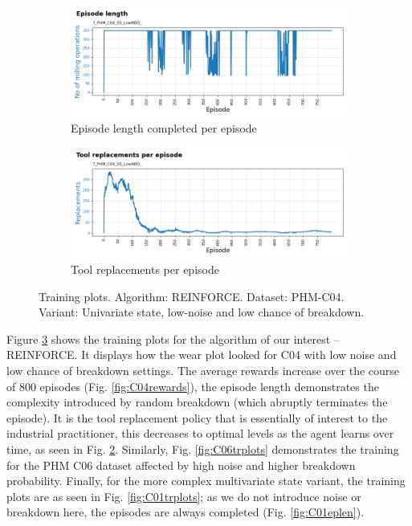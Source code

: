 \documentclass[a4paper, 12pt]{article}
\begin{document}
\begin{figure}[ht]
	\begin{subfigure}[b]{0.5\textwidth}
		\centering
		\includegraphics[width=\textwidth]{images/TrainingPlots/7_PHM_C04_SS_LowNBD__Episode_Length.png}  
		\caption{Episode length completed per episode}
		\label{fig:C04eplen}
	\end{subfigure}
	\hfill
	\begin{subfigure}[b]{0.5\textwidth}
		\centering
		\includegraphics[width=\textwidth]{images/TrainingPlots/7_PHM_C04_SS_LowNBD__Tool_Replacements.png}  
		\caption{Tool replacements per episode}
		\label{fig:C04toolrep}
	\end{subfigure} 
	\caption{Training plots. Algorithm: REINFORCE. Dataset: PHM-C04. Variant: Univariate state, low-noise and low chance of breakdown.}
	\label{fig:C04trplots}
\end{figure}
Figure \ref{fig:C04trplots} shows the training plots for the algorithm of our interest -- REINFORCE. It displays how the wear plot looked for C04 with low noise and low chance of breakdown settings. The average rewards increase over the course of 800 episodes (Fig. \ref{fig:C04rewards}), the episode length demonstrates the complexity introduced by random breakdown (which abruptly terminates the episode). It is the tool replacement policy that is essentially of interest to the industrial practitioner, this decreases to optimal levels as the agent learns over time, as seen in Fig. \ref{fig:C04toolrep}. Similarly, Fig. \ref{fig:C06trplots} demonstrates the training for the PHM C06 dataset affected by high noise and higher breakdown probability. Finally, for the more complex multivariate state variant, the training plots are as seen in Fig. \ref{fig:C01trplots}; as we do not introduce noise or breakdown here, the episodes are always completed (Fig. \ref{fig:C01eplen}).
\end{document}
